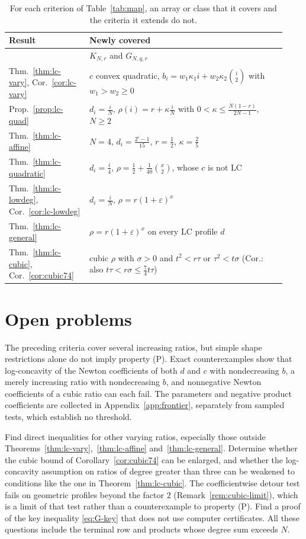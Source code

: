 \begin{table}[!ht]
\centering
\caption{For each criterion of Table~\ref{tab:map}, an array or class that it covers and the criteria it extends do not.}\label{tab:examples}
\renewcommand{\arraystretch}{1.15}
\begin{tabular}{@{}>{\raggedright\arraybackslash}p{0.27\linewidth}>{\raggedright\arraybackslash}p{0.66\linewidth}@{}}
Result & Newly covered\\\hline
\cite{P1} & $K_{N,r}$ and $G_{N,q,r}$\\
Thm.~\ref{thm:lc-vary}, Cor.~\ref{cor:lc-vary} & $c$ convex quadratic, $b_i=w_1\kappa_1i+w_2\kappa_2\binom i2$ with $w_1>w_2\geq0$\\
Prop.~\ref{prop:lc-quad} & $d_i=\frac iN$, $\rho(i)=r+\kappa\frac iN$ with $0<\kappa\leq\frac{N(1-r)}{2N-1}$, $N\geq2$\\
Thm.~\ref{thm:lc-affine} & $N=4$, $d_i=\frac{2^i-1}{15}$, $r=\frac12$, $\kappa=\frac25$\\
Thm.~\ref{thm:lc-quadratic} & $d_i=\frac i4$, $\rho=\frac12+\frac1{40}\binom x2$, whose $c$ is not LC\\
Thm.~\ref{thm:lc-lowdeg}, Cor.~\ref{cor:lc-lowdeg} & $d_i=\frac iN$, $\rho=r(1+\varepsilon)^x$\\
Thm.~\ref{thm:lc-general} & $\rho=r(1+\varepsilon)^x$ on every LC profile $d$\\
Thm.~\ref{thm:lc-cubic}, Cor.~\ref{cor:cubic74} & cubic $\rho$ with $\sigma>0$ and $t^2<r\tau$ or $\tau^2<t\sigma$ (Cor.: also $t\tau<r\sigma\leq\frac74t\tau$)
\end{tabular}
\end{table}

\section{Open problems}\label{sec:open}

The preceding criteria cover several increasing ratios, but simple shape restrictions alone do not imply property (P). Exact counterexamples show that log-concavity of the Newton coefficients of both $d$ and $c$ with nondecreasing $b$, a merely increasing ratio with nondecreasing $b$, and nonnegative Newton coefficients of a cubic ratio can each fail. The parameters and negative product coefficients are collected in Appendix~\ref{app:frontier}, separately from sampled tests, which establish no threshold.

Find direct inequalities for other varying ratios, especially those outside Theorems~\ref{thm:lc-vary},~\ref{thm:lc-affine} and~\ref{thm:lc-general}. Determine whether the cubic bound of Corollary~\ref{cor:cubic74} can be enlarged, and whether the log-concavity assumption on ratios of degree greater than three can be weakened to conditions like the one in Theorem~\ref{thm:lc-cubic}. The coefficientwise detour test fails on geometric profiles beyond the factor $2$ (Remark~\ref{rem:cubic-limit}), which is a limit of that test rather than a counterexample to property (P). Find a proof of the key inequality \eqref{eq:G-key} that does not use computer certificates. All these questions include the terminal row and products whose degree sum exceeds $N$.

